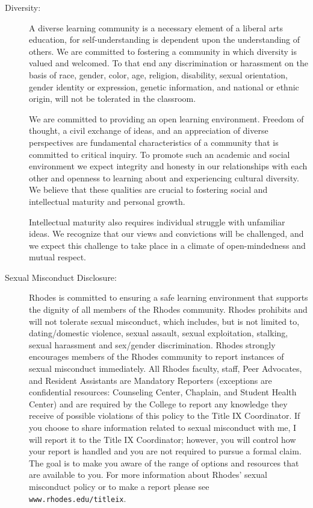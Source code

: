\documentclass [letterpaper,11pt]{article}
\begin{document}
\begin{description}
\item[Diversity:]
A diverse learning community is a necessary element of a liberal arts education, for self-understanding is dependent upon the understanding of others. 
We are committed to fostering a community in which diversity is valued and welcomed. To that end any discrimination or 
harassment on the basis of race, gender, color, age, religion, disability, sexual orientation, gender identity or expression, genetic information, and national or ethnic origin, will not be tolerated in the classroom.

We are committed to providing an open learning environment. Freedom of thought, a civil exchange of ideas, and an appreciation of diverse perspectives are fundamental characteristics of a community that is committed to critical inquiry. To promote such an academic and social environment we expect integrity and honesty in our relationships with each other and openness to learning about and experiencing cultural diversity. We believe that these qualities are crucial to fostering social and intellectual maturity and personal growth.

Intellectual maturity also requires individual struggle with unfamiliar ideas. We recognize that our views and convictions will be challenged, and we expect this challenge to take place in a climate of open-mindedness and mutual respect.

\item[Sexual Misconduct Disclosure:]
Rhodes is committed to ensuring a safe learning environment that supports the dignity of all members of the Rhodes community. Rhodes prohibits and will not tolerate sexual misconduct, which includes, but is not limited to, dating/domestic violence, sexual assault, sexual exploitation, stalking, sexual harassment and sex/gender discrimination. Rhodes strongly encourages members of the Rhodes community to report instances of sexual misconduct immediately.  All Rhodes faculty, staff, Peer Advocates, and Resident Assistants are Mandatory Reporters (exceptions are confidential resources: Counseling Center, Chaplain, and Student Health Center) and are required by the College to report any knowledge they receive of possible violations of this policy to the Title IX Coordinator.  If you choose to share information related to sexual misconduct with me, I will report it to the Title IX Coordinator; however, you will control how your report is handled and you are not required to pursue a formal claim.  The goal is to make you aware of the range of options and resources that are available to you.  For more information about Rhodes' sexual misconduct policy or to make a report please see \texttt{www.rhodes.edu/titleix}.


\end{description}
\end{document}
